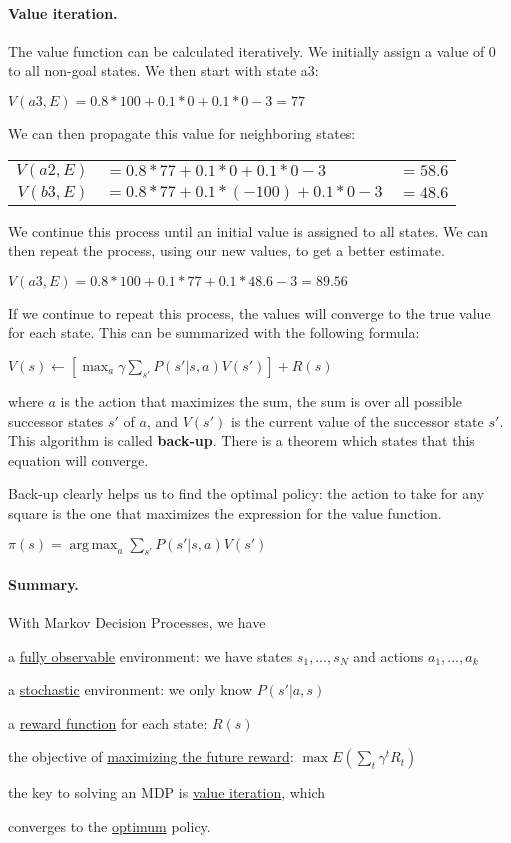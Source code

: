 \documentclass[10pt,a4paper]{article}
\newenvironment{itemize_packed}{
\begin{itemize}
\setlength{\itemsep}{0pt}
\setlength{\parskip}{0pt}
}{\end{itemize}}
\begin{document}
\paragraph{Value iteration.} The value function can be calculated iteratively. We initially assign a value of 0 to all non-goal states. We then start with state a3:
\begin{center}
$V(a3,E) = 0.8*100 + 0.1*0 + 0.1*0 - 3 = 77$
\end{center}
We can then propagate this value for neighboring states:
\begin{center}
\begin{tabular}{r@{ } @{}l@{} @{ }l}
$V(a2,E) $ & $= 0.8*77 + 0.1*0 + 0.1*0 - 3 $ & $= 58.6$ \\
$V(b3,E) $ & $= 0.8*77 + 0.1*(-100) + 0.1*0 - 3 $ & $= 48.6$
\end{tabular}
\end{center}
We continue this process until an initial value is assigned to all states. We can then repeat the process, using our new values, to get a better estimate.
\begin{center}
$V(a3,E) = 0.8*100 + 0.1*77 + 0.1*48.6 - 3 = 89.56$
\end{center}
If we continue to repeat this process, the values will converge to the true value for each state. This can be summarized with the following formula:
\begin{center}
$\displaystyle V(s) \leftarrow \left[ \max_a \gamma \sum_{s'}P(s'|s,a)V(s')\right] + R(s)$
\end{center}
where $a$ is the action that maximizes the sum, the sum is over all possible successor states $s'$ of $a$, and $V(s')$ is the current value of the successor state $s'$. This algorithm is called \textbf{back-up}. There is a theorem which states that this equation will converge.

Back-up clearly helps us to find the optimal policy: the action to take for any square is the one that maximizes the expression for the value function.
\begin{center}
$\displaystyle \pi(s) = \operatorname*{arg\,max}_a \sum_{s'}P(s'|s,a)V(s')$
\end{center}

\paragraph{Summary.} With Markov Decision Processes, we have
\begin{itemize_packed}
\item a \underline{fully observable} environment: we have states $s_1,\ldots,s_N$ and actions $a_1,\ldots,a_k$
\item a \underline{stochastic} environment: we only know $P(s'|a,s)$
\item a \underline{reward function} for each state: $R(s)$
\item the objective of \underline{maximizing the future reward}: $\max E(\sum_t \gamma^t R_t)$
\item the key to solving an MDP is \underline{value iteration}, which
\item converges to the \underline{optimum} policy.
\end{itemize_packed}
\end{document}
